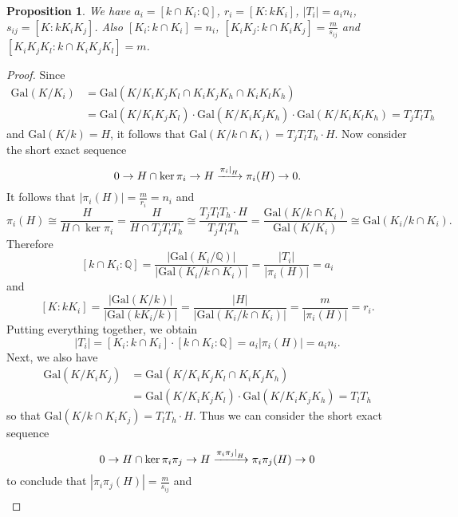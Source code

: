 \documentclass[12pt,a4paper]{article}
\newtheorem{prop}[theorem]{Proposition}
\theoremstyle{definition}
\newcommand{\Q}{\mathbb{Q}}
\newcommand{\Gal}{\mathrm{Gal}}
\newcommand\restr[2]{{%
  \left.\kern-\nulldelimiterspace %
  #1 %
  \right|_{#2} %
  }}
\begin{document}
\begin{prop}\label{degrees}
We have $a_i=[k\cap K_i:\Q]$, $r_i=[K:kK_i]$, $|T_i|=a_in_i$,  $s_{ij}=[K:kK_iK_j]$. Also $[K_i:k\cap K_i]=n_i$, $[K_iK_j:k\cap K_iK_j]=\frac{m}{s_{ij}}$ and $[K_iK_jK_l:k\cap K_iK_jK_l]=m$.
\end{prop}
\begin{proof}
Since
\begin{equation*}
\begin{split}
\Gal(K/K_i)&=\Gal(K/K_iK_jK_l\cap K_iK_jK_h\cap K_iK_lK_h)\\
&=\Gal(K/K_iK_jK_l)\cdot \Gal(K/K_iK_jK_h)\cdot \Gal(K/K_iK_lK_h)
= T_jT_lT_h
\end{split}
\end{equation*} 
 and $\Gal(K/k)=H$, it follows that $\Gal(K/k\cap K_i)= T_jT_lT_h\cdot H$. Now consider the short exact sequence %
$$0\to H\cap \ker \pi_i\to H \xrightarrow{\restr{\pi_i}{H}} \pi_i(H)\to 0.$$
It follows that $|\pi_i(H)|=\frac{m}{r_i}=n_i$ and $$\pi_i(H)\cong \frac{H}{H\cap \ker \pi_i}=\frac{H}{H\cap T_jT_lT_h}\cong \frac{T_jT_lT_h\cdot H}{T_jT_lT_h}= \frac{\Gal(K/k\cap K_i)}{\Gal(K/K_i)}\cong \Gal(K_i/k\cap K_i).$$
Therefore 
$$[k\cap K_i:\Q]=\frac{|\Gal(K_i/\Q)|}{|\Gal(K_i/k\cap K_i)|}=\frac{|T_i|}{|\pi_i(H)|}=a_i$$
and
$$[K:kK_i]=\frac{|\Gal(K/k)|}{|\Gal(kK_i/k)|}=\frac{|H|}{|\Gal(K_i/k\cap K_i)|}=\frac{m}{|\pi_i(H)|}=r_i.$$
Putting everything together, we obtain $$|T_i|=[K_i:k\cap K_i]\cdot[k\cap K_i:\Q]=a_i|\pi_i(H)|=a_in_i.$$
Next, we also have 
\begin{equation*}
\begin{split}
\Gal(K/K_iK_j)&=\Gal(K/K_iK_jK_l\cap K_iK_jK_h)\\
&=\Gal(K/K_iK_jK_l)\cdot \Gal(K/K_iK_jK_h)= T_lT_h
\end{split}
\end{equation*} 
so that $\Gal(K/k\cap K_iK_j)=T_lT_h\cdot H$. Thus we can consider the short exact sequence 
$$0\to H\cap \ker \pi_i\pi_j\to H \xrightarrow{\restr{\pi_i\pi_j}{H}} \pi_i\pi_j(H)\to 0$$
to conclude that $|\pi_i\pi_j(H)|=\frac{m}{s_{ij}}$ and 
\begin{equation*}
\begin{split}

\end{split}
\end{equation*}
\end{proof}
\end{document}
